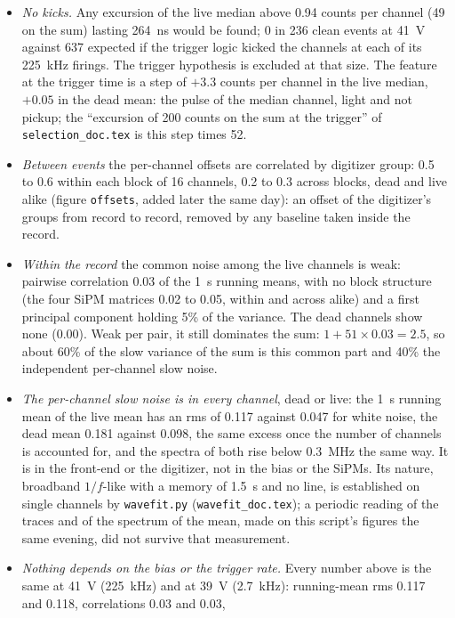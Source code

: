 \documentclass[11pt]{article}
\newcommand{\code}[1]{\texttt{#1}}
\newcommand{\us}{\textmu s}
\begin{document}
\begin{itemize}
\item \emph{No kicks.} Any excursion of the live median above 0.94
  counts per channel (49 on the sum) lasting 264~ns would be found; 0 in
  236 clean events at 41~V against 637 expected if the trigger logic
  kicked the channels at each of its 225~kHz firings. The trigger
  hypothesis is excluded at that size. The feature at the trigger time
  is a step of $+3.3$ counts per channel in the live median, $+0.05$ in
  the dead mean: the pulse of the median channel, light and not pickup;
  the ``excursion of 200 counts on the sum at the trigger'' of
  \code{selection\_doc.tex} is this step times 52.
\item \emph{Between events} the per-channel offsets are correlated by
  digitizer group: 0.5 to 0.6 within each block of 16 channels, 0.2 to
  0.3 across blocks, dead and live alike (figure \code{offsets}, added
  later the same day): an offset of the digitizer's groups from record
  to record, removed by any baseline taken inside the record.
\item \emph{Within the record} the common noise among the live channels
  is weak: pairwise correlation 0.03 of the 1~\us{} running means, with
  no block structure (the four SiPM matrices 0.02 to 0.05, within and
  across alike) and a first principal component holding 5\% of the
  variance. The dead channels show none (0.00). Weak per pair, it still
  dominates the sum: $1 + 51 \times 0.03 = 2.5$, so about 60\% of the
  slow variance of the sum is this common part and 40\% the independent
  per-channel slow noise.
\item \emph{The per-channel slow noise is in every channel}, dead or
  live: the 1~\us{} running mean of the live mean has an rms of 0.117
  against 0.047 for white noise, the dead mean 0.181 against 0.098, the
  same excess once the number of channels is accounted for, and the
  spectra of both rise below 0.3~MHz the same way. It is in the
  front-end or the digitizer, not in the bias or the SiPMs. Its nature,
  broadband $1/f$-like with a memory of 1.5~\us{} and no line, is
  established on single channels by \code{wavefit.py}
  (\code{wavefit\_doc.tex}); a periodic reading of the traces and of
  the spectrum of the mean, made on this script's figures the same
  evening, did not survive that measurement.
\item \emph{Nothing depends on the bias or the trigger rate.} Every
  number above is the same at 41~V (225~kHz) and at 39~V (2.7~kHz):
  running-mean rms 0.117 and 0.118, correlations 0.03 and 0.03,

\end{itemize}
\end{document}
